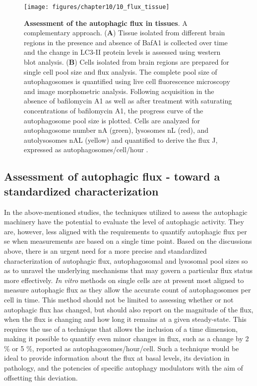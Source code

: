 \begin{figure}[!htbp]
  \texttt{[image: figures/chapter10/10\_flux\_tissue]}
  \caption[Assessment of the autophagic flux in tissues.]{\textbf{Assessment of the autophagic flux in tissues}. A complementary approach. (\textbf{A}) Tissue isolated from different brain regions in the presence and absence of BafA1 is collected over time and the change in LC3-II protein levels is assessed using western blot analysis. (\textbf{B}) Cells isolated from brain regions are prepared for single cell pool size and flux analysis. The complete pool size of autophagosomes is quantified using live cell fluorescence microscopy and image morphometric analysis. Following acquisition in the absence of bafilomycin A1 as well as after treatment with saturating concentrations of bafilomycin A1, the progress curve of the autophagosome pool size is plotted. Cells are analyzed for autophagosome number nA (green), lysosomes nL (red), and autolysosomes nAL (yellow) and quantified to derive the flux J, expressed as autophagosomes/cell/hour \citep{lumkwana2017}.}
  \label{fig:10_flux_tissue}
\end{figure}

\subsection{Assessment of autophagic flux - toward a standardized characterization}
In the above-mentioned studies, the techniques utilized to assess the autophagic machinery have the potential to evaluate the level of autophagic activity. They are, however, less aligned with the requirements to quantify autophagic flux per se when measurements are based on a single time point. Based on the discussions above, there is an urgent need for a more precise and standardized characterization of autophagic flux, autophagosomal and lysosomal pool sizes so as to unravel the underlying mechanisms that may govern a particular flux status more effectively. \textit{In vitro} methods on single cells are at present most aligned to measure autophagic flux as they allow the accurate count of autophagosomes per cell in time. This method should not be limited to assessing whether or not autophagic flux has changed, but should also report on the magnitude of the flux, when the flux is changing and how long it remains at a given steady-state. This requires the use of a technique that allows the inclusion of a time dimension, making it possible to quantify even minor changes in flux, such as a change by 2 \% or 5 \%, reported as autophagosomes/hour/cell. Such a technique would be ideal to provide information about the flux at basal levels, its deviation in pathology, and the potencies of specific autophagy modulators with the aim of offsetting this deviation. 

